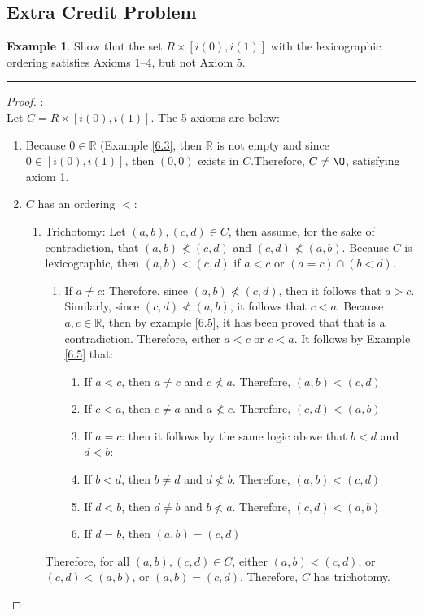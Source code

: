 \documentclass[openany, amssymb, psamsfonts]{amsart}
\newcommand{\bbR}{\mathbb{R}}
\renewcommand{\emptyset}{\O}
\theoremstyle{definition}
\newtheorem{exmp}{Example}[section]
\numberwithin{equation}{section}
\begin{document}
\subsection*{Extra Credit Problem}
\begin{exmp}
Show that the set $R × [i(0), i(1)]$ with the lexicographic ordering satisfies Axioms 1–4, but not Axiom 5.
\end{exmp}
\vspace{4pt}     \hrule   \vspace{4pt}
\begin{proof}:\\
Let $C = R × [i(0), i(1)]$. The 5 axioms are below:
\begin{enumerate} [1]
\item Because $0\in \bbR$ (Example \ref{6.3}, then $\bbR$ is not empty and since $0\in [i(0),i(1)]$, then $(0,0)$ exists in $C$.Therefore, $C \neq \emptyset$, satisfying axiom 1.
\item $C$ has an ordering $<$:
\begin{enumerate}
\item Trichotomy: Let $(a,b), (c,d) \in C$, then assume, for the sake of contradiction, that $(a,b)\not < (c,d)$ and $(c,d) \not < (a,b)$. Because $C$ is lexicographic, then $(a,b)<(c,d)$ if $a<c$ or $(a=c) \cap (b<d)$.
\begin{enumerate}
\item If $a\neq c$: Therefore, since $(a,b)\not < (c,d)$, then it follows that $a > c$. Similarly, since $(c,d) \not < (a,b)$, it follows that $c<a$. Because $a,c \in \bbR$, then by example \ref{6.5}, it has been proved that that is a contradiction. Therefore, either $a<c$ or $c<a$. It follows by Example \ref{6.5} that: 
\begin{enumerate}
\item If $a<c$, then  $a\neq c$ and $c\not < a$. Therefore, $(a,b)<(c,d)$
\item If $c<a$, then  $c\neq a$ and $a\not < c$. Therefore, $(c,d)<(a,b)$
\item If $a=c$: then it follows by the same logic above that $b<d$ and $d<b$:
\item If $b<d$, then  $b\neq d$ and $d\not < b$. Therefore, $(a,b)<(c,d)$
\item If $d<b$, then  $d\neq b$ and $b\not < a$. Therefore, $(c,d)<(a,b)$
\item If $d=b$, then $(a,b) = (c,d)$
\end{enumerate}
\end{enumerate}
Therefore, for all $(a,b), (c,d) \in C$, either $(a,b)<(c,d)$, or $(c,d)<(a,b)$, or $(a,b) = (c,d)$. Therefore, $C$ has trichotomy.

\end{enumerate}
\end{enumerate}
\end{proof}
\end{document}
